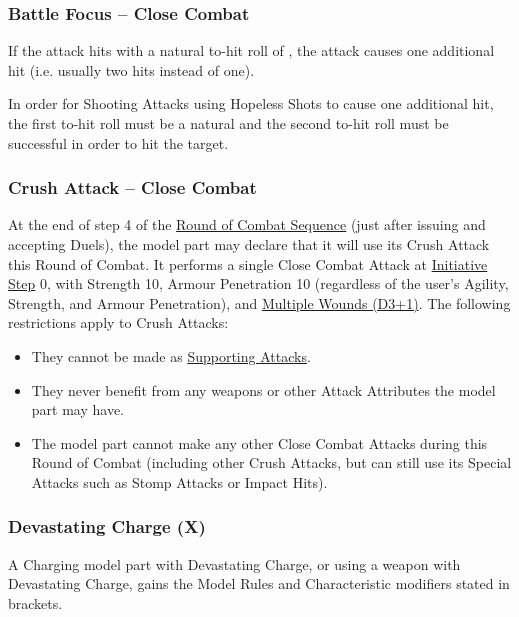 \newpage
\subsubsection{Battle Focus -- Close Combat}
\idx[main=y]{\battlefocus}\label{battle_focus}

If the attack hits with a natural to-hit roll of , the attack causes one additional hit (i.e. usually two hits instead of one).

In order for Shooting Attacks using Hopeless Shots to cause one additional hit, the first to-hit roll must be a natural  and the second to-hit roll must be successful in order to hit the target.

\subsubsection{Crush Attack -- Close Combat}
\idx[main=y]{\crushattack}\label{crush_attack}

At the end of step 4 of the \hyperref[round_of_combat_sequence]{Round of Combat Sequence} (just after issuing and accepting Duels), the model part may declare that it will use its Crush Attack this Round of Combat. It performs a single Close Combat Attack at \hyperref[initiative_order]{Initiative Step} 0, with Strength 10, Armour Penetration 10 (regardless of the user's Agility, Strength, and Armour Penetration), and \hyperref[multiple_wounds]{Multiple Wounds (D3+1)}. The following restrictions apply to Crush Attacks:

\begin{itemize}
\item They cannot be made as \hyperref[supporting_attacks]{Supporting Attacks}.
\item They never benefit from any weapons or other Attack Attributes the model part may have.
\item The model part cannot make any other Close Combat Attacks during this Round of Combat (including other Crush Attacks, but can still use its Special Attacks such as Stomp Attacks or Impact Hits).
\end{itemize}

\subsubsection{Devastating Charge (X)}
\idx[main=y]{\devastatingcharge{}}\label{devastating_charge}

A Charging model part with Devastating Charge, or using a weapon with Devastating Charge, gains the Model Rules and Characteristic modifiers stated in brackets.


